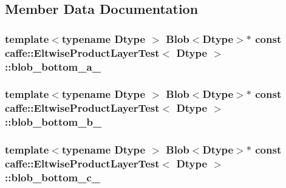 \subsection{Member Data Documentation}
\hypertarget{classcaffe_1_1_eltwise_product_layer_test_a99b6a7e85b88545e12bf33ad8d40256c}{
\subsubsection[{blob\+\_\+bottom\+\_\+a\+\_\+}]{\setlength{\rightskip}{0pt plus 5cm}template$<$typename Dtype $>$ {\bf Blob}$<$Dtype$>$$\ast$ const {\bf caffe\+::\+Eltwise\+Product\+Layer\+Test}$<$ Dtype $>$\+::blob\+\_\+bottom\+\_\+a\+\_\+\hspace{0.3cm}{\ttfamily [protected]}}}\label{classcaffe_1_1_eltwise_product_layer_test_a99b6a7e85b88545e12bf33ad8d40256c}
\hypertarget{classcaffe_1_1_eltwise_product_layer_test_a6f22183c4c7ca00ca9d37dd8b044ee33}{
\subsubsection[{blob\+\_\+bottom\+\_\+b\+\_\+}]{\setlength{\rightskip}{0pt plus 5cm}template$<$typename Dtype $>$ {\bf Blob}$<$Dtype$>$$\ast$ const {\bf caffe\+::\+Eltwise\+Product\+Layer\+Test}$<$ Dtype $>$\+::blob\+\_\+bottom\+\_\+b\+\_\+\hspace{0.3cm}{\ttfamily [protected]}}}\label{classcaffe_1_1_eltwise_product_layer_test_a6f22183c4c7ca00ca9d37dd8b044ee33}
\hypertarget{classcaffe_1_1_eltwise_product_layer_test_ae30c5e2a87e6f87aaca79fa495a5e598}{
\subsubsection[{blob\+\_\+bottom\+\_\+c\+\_\+}]{\setlength{\rightskip}{0pt plus 5cm}template$<$typename Dtype $>$ {\bf Blob}$<$Dtype$>$$\ast$ const {\bf caffe\+::\+Eltwise\+Product\+Layer\+Test}$<$ Dtype $>$\+::blob\+\_\+bottom\+\_\+c\+\_\+\hspace{0.3cm}{\ttfamily [protected]}}}\label{classcaffe_1_1_eltwise_product_layer_test_ae30c5e2a87e6f87aaca79fa495a5e598}

